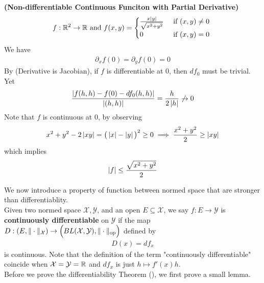 \documentclass{report}
\begin{document}
\begin{mdframed}

\begin{Example}{\textbf{(Non-differentiable Continuous Funciton with Partial Derivative)}}{}
\begin{align*}
f:\mathbb{R}^2 \rightarrow \mathbb{R}\text{ and }f(x,y)=\begin{cases}
  \frac{x\left|y\right|}{\sqrt{x^2+y^2} }& \text{ if $(x,y)\neq 0$ }\\
  0& \text{ if $(x,y)=0$ }
\end{cases}
\end{align*}
We have 
\begin{align*}
\partial_xf(0)=\partial_yf(0)=0
\end{align*}
By  (Derivative is Jacobian), if $f$ is differentiable at $0$, then  $df_0$ must be trivial. Yet  
\begin{align*}
\frac{\left|f(h,h)-f(0)-df_0(h,h)\right|}{\left|(h,h)\right|}=\frac{h }{2\left|h\right| }\not\to 0 
\end{align*}
Note that $f$ is continuous at  $0$, by observing 
\begin{align*}
  x^2+y^2- 2\left|xy\right|=\big(\left|x\right|-\left|y\right| \big)^2\geq 0 \implies \frac{x^2+y^2}{2}\geq \left|xy\right|
\end{align*}
which implies 
\begin{align*}
\left|f\right|\leq \frac{\sqrt{x^2+y^2} }{2}
\end{align*}
\end{Example}
\end{mdframed}
\begin{mdframed}
We now introduce a property of function between normed space that are stronger than differentiablity.\\

Given two normed space $\mathcal{X},\mathcal{Y}$, and an open $E\subseteq \mathcal{X}$, we say $f:E\rightarrow \mathcal{Y}$ is \textbf{continuously differentiable } on $\mathcal{Y}$ if the map $D:(E,\| \cdot \|_\mathcal{X})\rightarrow \Big(BL(\mathcal{X},\mathcal{Y}), \| \cdot \|_\text{op} \Big)$ defined by 
\begin{align*}
D(x)=df_x
\end{align*}
is continuous. Note that the definition of the term "continuously differentiable" coincide when $\mathcal{X}=\mathcal{Y}=\mathbb{R}$ and $df_x$ is just $h\mapsto f'(x)h$.\\

Before we prove the differentiability Theorem (), we first prove a small lemma. 
\end{mdframed}
\end{document}
